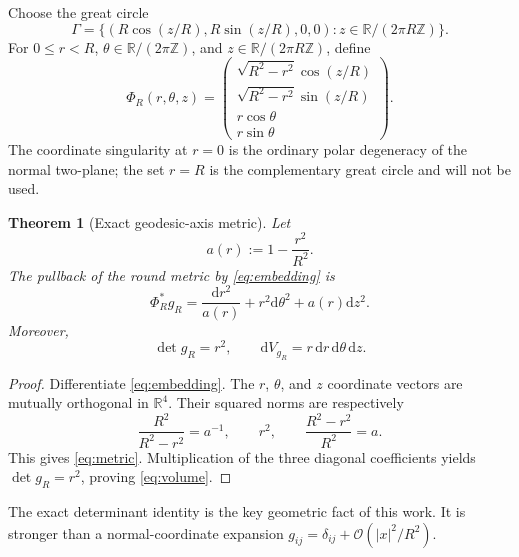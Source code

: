 \documentclass[aps,prd,reprint,superscriptaddress,nofootinbib,floatfix]{revtex4-2}
\newtheorem{theorem}{Theorem}
\theoremstyle{definition}
\theoremstyle{remark}
\newcommand{\RR}{\mathbb{R}}
\newcommand{\dd}{\mathrm{d}}
\newcommand{\OO}{\mathcal{O}}
\begin{document}
Choose the great circle
\begin{equation}
	\Gamma=\{(R\cos(z/R),R\sin(z/R),0,0):z\in\RR/(2\pi R\mathbb Z)\}.
\end{equation}
For $0\le r<R$, $\theta\in\RR/(2\pi\mathbb Z)$, and $z\in\RR/(2\pi R\mathbb Z)$, define
\begin{equation}
	\Phi_R(r,\theta,z)=
	\begin{pmatrix}
		\sqrt{R^2-r^2}\cos(z/R) \\
		\sqrt{R^2-r^2}\sin(z/R) \\
		r\cos\theta             \\
		r\sin\theta
	\end{pmatrix}.
	\label{eq:embedding}
\end{equation}
The coordinate singularity at $r=0$ is the ordinary polar degeneracy of the normal two-plane; the set $r=R$ is the complementary great circle and will not be used.

\begin{theorem}[Exact geodesic-axis metric]\label{thm:metric}
	Let
	\begin{equation}
		a(r):=1-\frac{r^2}{R^2}.
	\end{equation}
	The pullback of the round metric by \cref{eq:embedding} is
	\begin{equation}
		\Phi_R^*g_R=\frac{\dd r^2}{a(r)}+r^2\dd\theta^2+a(r)\dd z^2.
		\label{eq:metric}
	\end{equation}
	Moreover,
	\begin{equation}
		\det g_R=r^2,\qquad \dd V_{g_R}=r\,\dd r\,\dd\theta\,\dd z.
		\label{eq:volume}
	\end{equation}
\end{theorem}

\begin{proof}
	Differentiate \cref{eq:embedding}. The $r$, $\theta$, and $z$ coordinate vectors are mutually orthogonal in $\RR^4$. Their squared norms are respectively
	\begin{equation}
		\frac{R^2}{R^2-r^2}=a^{-1},\qquad r^2,\qquad \frac{R^2-r^2}{R^2}=a.
	\end{equation}
	This gives \cref{eq:metric}. Multiplication of the three diagonal coefficients yields $\det g_R=r^2$, proving \cref{eq:volume}.
\end{proof}

The exact determinant identity is the key geometric fact of this work. It is stronger than a normal-coordinate expansion $g_{ij}=\delta_{ij}+\OO(|x|^2/R^2)$.
\end{document}
